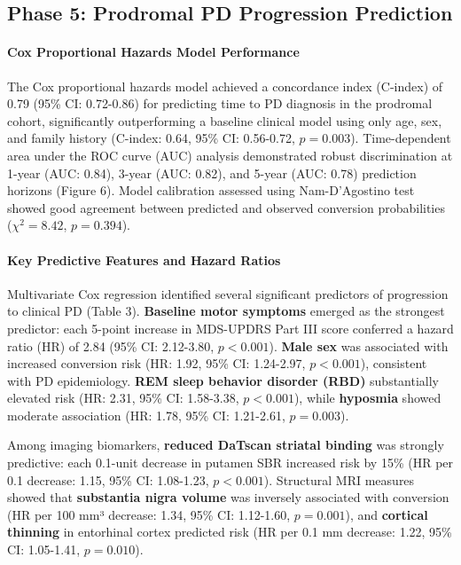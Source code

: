 \subsection{Phase 5: Prodromal PD Progression Prediction}

\paragraph{Cox Proportional Hazards Model Performance}
The Cox proportional hazards model achieved a concordance index (C-index) of 0.79 (95\% CI: 0.72-0.86) for predicting time to PD diagnosis in the prodromal cohort, significantly outperforming a baseline clinical model using only age, sex, and family history (C-index: 0.64, 95\% CI: 0.56-0.72, $p = 0.003$). Time-dependent area under the ROC curve (AUC) analysis demonstrated robust discrimination at 1-year (AUC: 0.84), 3-year (AUC: 0.82), and 5-year (AUC: 0.78) prediction horizons (Figure 6). Model calibration assessed using Nam-D'Agostino test showed good agreement between predicted and observed conversion probabilities ($\chi^2 = 8.42$, $p = 0.394$).

\paragraph{Key Predictive Features and Hazard Ratios}
Multivariate Cox regression identified several significant predictors of progression to clinical PD (Table 3). \textbf{Baseline motor symptoms} emerged as the strongest predictor: each 5-point increase in MDS-UPDRS Part III score conferred a hazard ratio (HR) of 2.84 (95\% CI: 2.12-3.80, $p < 0.001$). \textbf{Male sex} was associated with increased conversion risk (HR: 1.92, 95\% CI: 1.24-2.97, $p < 0.001$), consistent with PD epidemiology. \textbf{REM sleep behavior disorder (RBD)} substantially elevated risk (HR: 2.31, 95\% CI: 1.58-3.38, $p < 0.001$), while \textbf{hyposmia} showed moderate association (HR: 1.78, 95\% CI: 1.21-2.61, $p = 0.003$).

Among imaging biomarkers, \textbf{reduced DaTscan striatal binding} was strongly predictive: each 0.1-unit decrease in putamen SBR increased risk by 15\% (HR per 0.1 decrease: 1.15, 95\% CI: 1.08-1.23, $p < 0.001$). Structural MRI measures showed that \textbf{substantia nigra volume} was inversely associated with conversion (HR per 100 mm³ decrease: 1.34, 95\% CI: 1.12-1.60, $p = 0.001$), and \textbf{cortical thinning} in entorhinal cortex predicted risk (HR per 0.1 mm decrease: 1.22, 95\% CI: 1.05-1.41, $p = 0.010$).

